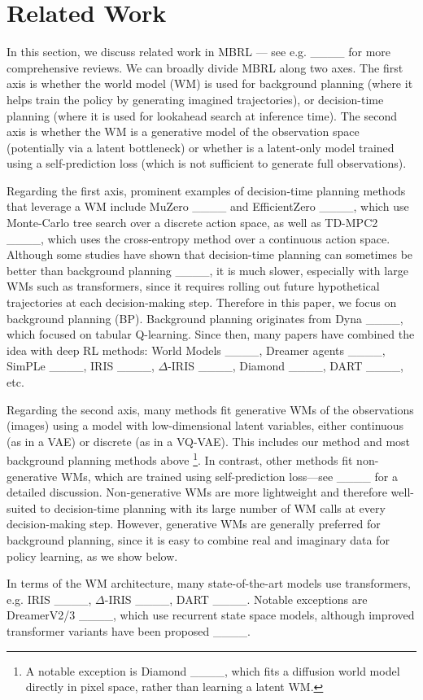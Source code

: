 \section{Related Work}
\label{sec:related}

In this section, we discuss related work in MBRL --- see e.g. ____ 
for more comprehensive reviews.
We can broadly divide MBRL along two axes.
The first axis is whether the world model (WM) is used for background planning
(where it helps train the policy by generating imagined trajectories),
or decision-time planning (where it is used for lookahead search at inference time). 
The second axis is whether the WM is a generative model of the observation space (potentially via a latent bottleneck) or whether is a latent-only model trained using a self-prediction loss
(which is not sufficient to generate full observations).

Regarding the first axis, prominent examples of decision-time planning methods that leverage a WM include MuZero ____ and EfficientZero  ____, which use Monte-Carlo tree search over a discrete action space, as well as TD-MPC2 ____, which uses the cross-entropy method over a continuous action space.
Although some studies have shown that decision-time planning can sometimes be better
than background planning ____, it is much slower, especially with large WMs such as transformers, since it requires rolling out future hypothetical trajectories at each decision-making step.
Therefore in this paper, we focus on background planning (BP).
Background planning originates from Dyna ____, which focused on tabular Q-learning.
Since then, many papers have combined the idea with deep RL methods: World Models ____,
Dreamer agents  ____,
SimPLe ____,
IRIS ____,
$\Delta$-IRIS ____,
Diamond ____,
DART ____, etc.

Regarding the second axis, 
many methods fit generative WMs of the
observations (images) using a 
model with low-dimensional latent variables,
either continuous (as in a VAE)
or discrete (as in a VQ-VAE).
This includes our method and most background planning methods above
\footnote{
%
A notable exception is 
Diamond ____,
which fits a diffusion world model
directly in pixel space,
rather than learning a latent WM. %
}.
In contrast, other methods fit non-generative WMs, which are trained using self-prediction loss---see ____ for a detailed discussion.
Non-generative WMs are more lightweight and therefore well-suited to decision-time planning with its large number of WM calls at every decision-making step.
However,
generative WMs are generally preferred for background planning, since it is easy to combine real and imaginary data for policy learning,
as we show below.

 
In terms of the WM architecture, many state-of-the-art models use transformers, e.g. 
IRIS ____,
$\Delta$-IRIS ____,
DART ____.
Notable exceptions are DreamerV2/3  ____, which use recurrent state space models,
although improved transformer variants have been proposed 
____.